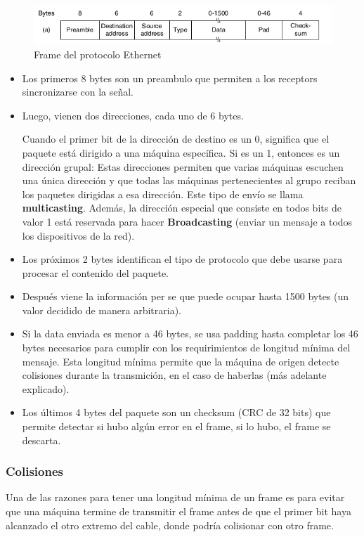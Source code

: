 \begin{figure}[H]
	\centering
	\includegraphics[width=\textwidth
]{images/ethernet-mac-frame.png}
	\caption[Frame del protocolo Ethernet]{Frame del protocolo Ethernet}
	\label{fig:ethernet-mac-frame}
\end{figure}

\begin{itemize}
  \item Los primeros 8 bytes son un preambulo que permiten a los receptors sincronizarse con la señal.
  \item Luego, vienen dos direcciones, cada uno de 6 bytes. 
  
  Cuando el primer bit de la dirección de destino es un 0, significa que el paquete está dirigido a una máquina específica.  Si es un 1, entonces es un dirección grupal: Estas direcciones permiten que varias máquinas escuchen una única dirección y que todas las máquinas pertenecientes al grupo reciban los paquetes dirigidas a esa dirección. Este tipo de envío se llama \textbf{multicasting}. Además, la dirección especial que consiste en todos bits de valor 1 está reservada para hacer \textbf{Broadcasting} (enviar un mensaje a todos los dispositivos de la red).
  \item Los próximos 2 bytes identifican el tipo de protocolo que debe usarse para procesar el contenido del paquete.
  \item Después viene la información per se que puede ocupar hasta 1500 bytes (un valor decidido de manera arbitraria).
  \item Si la data enviada es menor a 46 bytes, se usa padding hasta completar los 46 bytes necesarios para cumplir con los requirimientos de longitud mínima del mensaje. Esta longitud mínima permite que la máquina de origen detecte colisiones durante la transmición, en el caso de haberlas (más adelante explicado).
  \item Los últimos 4 bytes del paquete son un checksum (CRC de 32 bits) que permite detectar si hubo algún error en el frame, si lo hubo, el frame se descarta.
\end{itemize}

\subsubsection{Colisiones}
Una de las razones para tener una longitud mínima de un frame es para evitar que una máquina termine de transmitir el frame antes de que el primer bit haya alcanzado el otro extremo del cable, donde podría colisionar con otro frame.

